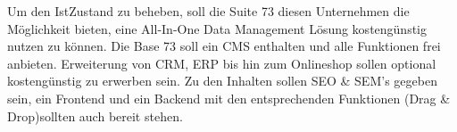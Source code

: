 	Um den IstZustand zu beheben, soll die Suite 73 diesen Unternehmen die Möglichkeit bieten, eine All-In-One Data Management Lösung kostengünstig nutzen zu können.
	Die Base 73 soll ein CMS enthalten und alle Funktionen frei anbieten. Erweiterung von CRM, ERP bis hin zum Onlineshop sollen optional kostengünstig zu erwerben sein.
	Zu den Inhalten sollen SEO \& SEM's gegeben sein, ein Frontend und ein Backend  mit den entsprechenden Funktionen (Drag \& Drop)sollten auch bereit stehen.